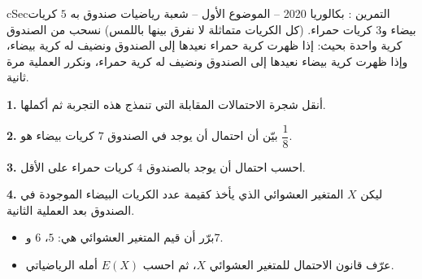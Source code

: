 \documentclass[12pt,a4paper]{article}
\newenvironment{BOX}[2]{\begin{otherlanguage}{english}\begin{arbox}{#1}{#2}}{\end{arbox}\end{otherlanguage}}
\newcounter{exo}
\newenvironment{tamrin}[1]{\stepcounter{exo}\begin{BOX}{cSec}{التمرين \theexo: #1}}{\end{BOX}}
\newenvironment{LTR}{\begin{otherlanguage}{english}}{\end{otherlanguage}}
\renewcommand{\ldots}{\mathinner{\ldotp\ldotp\ldotp}}
\newenvironment{sq}{\begin{itemize}[leftmargin=2.4em,itemsep=3pt]}{\end{itemize}}
\newcommand{\qa}{\item[(أ)]}\newcommand{\qb}{\item[(ب)]}\newcommand{\qc}{\item[(جـ)]}\newcommand{\qd}{\item[(د)]}\newcommand{\qe}{\item[(هـ)]}
\newcommand{\QQ}[1]{\par\smallskip\textbf{#1.} }
\begin{document}
\begin{tamrin}{بكالوريا 2020 -- الموضوع الأول -- شعبة رياضيات}
صندوق به $5$ كريات بيضاء و$3$ كريات حمراء. (كل الكريات متماثلة لا نفرق بينها باللمس)
نسحب من الصندوق كرية واحدة بحيث: إذا ظهرت كرية حمراء نعيدها إلى الصندوق ونضيف له كرية بيضاء، وإذا ظهرت كرية بيضاء نعيدها إلى الصندوق ونضيف له كرية حمراء، ونكرر العملية مرة ثانية.
\begin{center}\begin{LTR}\end{LTR}\end{center}
\QQ{1} أنقل شجرة الاحتمالات المقابلة التي تنمذج هذه التجربة ثم أكملها.
\QQ{2} بيّن أن احتمال أن يوجد في الصندوق $7$ كريات بيضاء هو $\dfrac18$.
\QQ{3} احسب احتمال أن يوجد بالصندوق $4$ كريات حمراء على الأقل.
\QQ{4} ليكن $X$ المتغير العشوائي الذي يأخذ كقيمة عدد الكريات البيضاء الموجودة في الصندوق بعد العملية الثانية.
\begin{sq}
\qa برّر أن قيم المتغير العشوائي هي: $5$، $6$ و$7$.
\qb عرّف قانون الاحتمال للمتغير العشوائي $X$، ثم احسب $E(X)$ أمله الرياضياتي.
\end{sq}
\end{tamrin}
\end{document}
